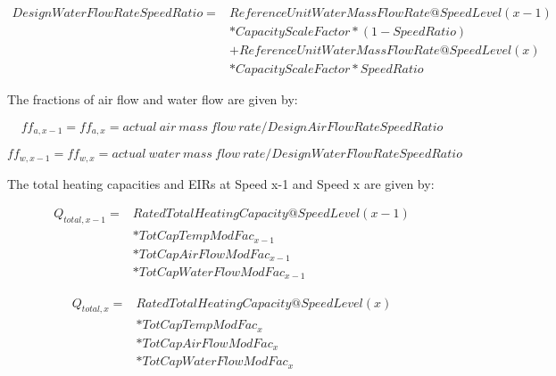 \begin{equation}
  \begin{array}{rl}
    DesignWaterFlowRateSpeedRatio =& ReferenceUnitWaterMassFlowRate@SpeedLevel\left( {x - 1} \right) \\
                                  &* CapacityScaleFactor * \left(1-SpeedRatio\right) \\
                                  &+ ReferenceUnitWaterMassFlowRate@SpeedLevel\left( x \right) \\
                                  &* CapacityScaleFactor * SpeedRatio
  \end{array}
\end{equation}

The fractions of air flow and water flow are given by:

\begin{equation}
ff_{a,x-1} = ff_{a,x} = actual~air~mass~flow~rate/DesignAirFlowRateSpeedRatio
\end{equation}

\begin{equation}
ff_{w,x-1} = ff_{w,x} = actual~water~mass~flow~rate/DesignWaterFlowRateSpeedRatio
\end{equation}

The total heating capacities and EIRs at Speed x-1 and Speed x are given by:

\begin{equation}
  \begin{array}{rl}
    Q_{total,x - 1} =& RatedTotalHeatingCapacity@SpeedLevel\left( {x - 1} \right) \\
                    &* TotCapTempModFac_{x - 1} \\
                    &* TotCapAirFlowModFac_{x - 1} \\
                    &* TotCapWaterFlowModFac_{x - 1}
  \end{array}
\end{equation}

\begin{equation}
  \begin{array}{rl}
    Q_{total,x} =& RatedTotalHeatingCapacity@SpeedLevel\left( x \right) \\
                &* TotCapTempModFac_x \\
                &* TotCapAirFlowModFac_x \\
                &* TotCapWaterFlowModFac_x 
 \end{array}
\end{equation}

